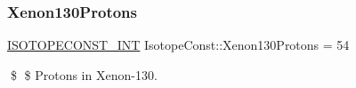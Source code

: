 \subsubsection{\texorpdfstring{Xenon130\+Protons}{Xenon130Protons}}
{\footnotesize\ttfamily \mbox{\hyperlink{group___isotope_const-_macros_ga5f18360b3e99483a35c32d789e62621c}{I\+S\+O\+T\+O\+P\+E\+C\+O\+N\+S\+T\+\_\+\+I\+NT}} Isotope\+Const\+::\+Xenon130\+Protons = 54}

\$ \$ Protons in Xenon-\/130. 